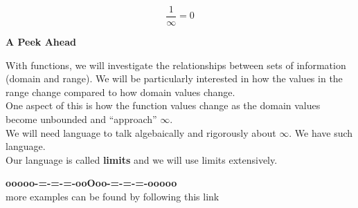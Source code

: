 \documentclass{ximera}
\begin{document}
\begin{question}


\[  \frac{1}{\infty} = 0 \]


\begin{multipleChoice}
\end{multipleChoice}


\end{question}











\item \textbf{\textcolor{purple!85!blue}{A Peek Ahead}} 


With functions, we will investigate the relationships between sets of information (domain and range).  We will be particularly interested in how the values in the range change compared to how domain values change. \\

One aspect of this is how the function values change as the domain values become unbounded and ``approach'' $\infty$. \\

We will need language to talk algebaically and rigorously about $\infty$. We have such language.  \\


Our language is called \textbf{limits} and we will use limits extensively.\\











\begin{onlineOnly}
\begin{center}
\textbf{\textcolor{green!50!black}{ooooo-=-=-=-ooOoo-=-=-=-ooooo}} \\

more examples can be found by following this link\\ 

\end{center}
\end{onlineOnly}
\end{document}
